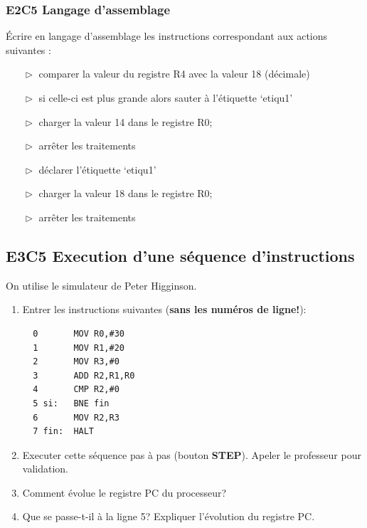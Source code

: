 \documentclass[11pt,french]{article}
\begin{document}
\hypertarget{e2c5-langage-dassemblage}{%
\subsubsection{E2C5 Langage
d'assemblage}\label{e2c5-langage-dassemblage}}

Écrire en langage d'assemblage les instructions correspondant aux
actions suivantes :
\begin{itemize}
\item[$\vartriangleright$] comparer la valeur du registre R4 avec la valeur 18 (décimale)
\item[$\vartriangleright$] si celle-ci est plus grande alors sauter à l'étiquette `etiqu1'
\item[$\vartriangleright$] charger la valeur 14 dans le registre R0; 
\item[$\vartriangleright$] arrêter les traitements 
\item[$\vartriangleright$] déclarer l'étiquette `etiqu1' 
\item[$\vartriangleright$] charger la valeur 18 dans le registre R0; 
\item[$\vartriangleright$] arrêter les traitements
\end{itemize}

\hypertarget{execution-dune-suxe9quence-dinstructions}{%
\subsection{E3C5 Execution d'une séquence
d'instructions}\label{execution-dune-suxe9quence-dinstructions}}

On utilise le simulateur de Peter Higginson.
\begin{enumerate}
\item Entrer les instructions suivantes (\textbf{sans les numéros de ligne!}):
	\begin{verbatim}
  0       MOV R0,#30
  1       MOV R1,#20
  2       MOV R3,#0
  3       ADD R2,R1,R0
  4       CMP R2,#0
  5 si:   BNE fin
  6       MOV R2,R3
  7 fin:  HALT
	\end{verbatim}
\item
  Executer cette séquence pas à pas (bouton \textbf{STEP}). Apeler le professeur pour validation.
  \item Comment évolue le  registre PC du processeur?
\item
  Que se passe-t-il à la ligne 5? Expliquer l'évolution du registre PC.
\end{enumerate}
\end{document}
